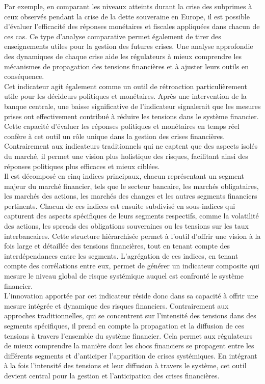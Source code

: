 \begin{sloppypar}
Par exemple, en comparant les niveaux atteints durant la crise des subprimes à ceux observés pendant la crise de la dette souveraine en Europe, il est possible d’évaluer l’efficacité des réponses monétaires et fiscales appliquées dans chacun de ces cas. Ce type d’analyse comparative permet également de tirer des enseignements utiles pour la gestion des futures crises. Une analyse approfondie des dynamiques de chaque crise aide les régulateurs à mieux comprendre les mécanismes de propagation des tensions financières et à ajuster leurs outils en conséquence.\\

Cet indicateur agit également comme un outil de rétroaction particulièrement utile pour les décideurs politiques et monétaires. Après une intervention de la banque centrale, une baisse significative de l’indicateur signalerait que les mesures prises ont effectivement contribué à réduire les tensions dans le système financier. Cette capacité d’évaluer les réponses politiques et monétaires en temps réel confère à cet outil un rôle unique dans la gestion des crises financières. Contrairement aux indicateurs traditionnels qui ne captent que des aspects isolés du marché, il permet une vision plus holistique des risques, facilitant ainsi des réponses politiques plus efficaces et mieux ciblées.\\

Il est décomposé en cinq indices principaux, chacun représentant un segment majeur du marché financier, tels que le secteur bancaire, les marchés obligataires, les marchés des actions, les marchés des changes et les autres segments financiers pertinents. Chacun de ces indices est ensuite subdivisé en sous-indices qui capturent des aspects spécifiques de leurs segments respectifs, comme la volatilité des actions, les spreads des obligations souveraines ou les tensions sur les taux interbancaires. Cette structure hiérarchisée permet à l’outil d’offrir une vision à la fois large et détaillée des tensions financières, tout en tenant compte des interdépendances entre les segments. L’agrégation de ces indices, en tenant compte des corrélations entre eux, permet de générer un indicateur composite qui mesure le niveau global de risque systémique auquel est confronté le système financier.\\

L’innovation apportée par cet indicateur réside donc dans sa capacité à offrir une mesure intégrée et dynamique des risques financiers. Contrairement aux approches traditionnelles, qui se concentrent sur l’intensité des tensions dans des segments spécifiques, il prend en compte la propagation et la diffusion de ces tensions à travers l’ensemble du système financier. Cela permet aux régulateurs de mieux comprendre la manière dont les chocs financiers se propagent entre les différents segments et d’anticiper l’apparition de crises systémiques. En intégrant à la fois l’intensité des tensions et leur diffusion à travers le système, cet outil devient central pour la gestion et l’anticipation des crises financières.



\end{sloppypar}
